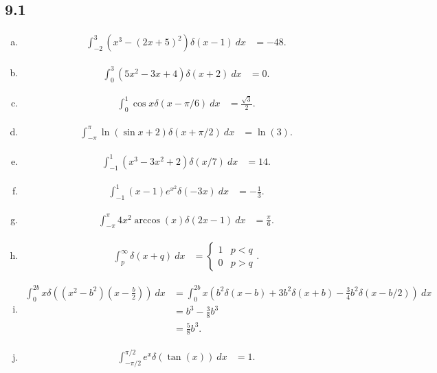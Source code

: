\documentclass[10pt]{mypackage}
\newcommand{\df}{\delta\!}
\begin{document}
\subsection{9.1}%
\begin{enumerate}[(a)]
  \item 
    \begin{align*}
      \int_{-2}^{3} \left(x^3 -\left(2x + 5\right)^2\right)\df\left(x-1\right)\:dx &= -48.
    \end{align*}
  \item
    \begin{align*}
      \int_{0}^{3} \left(5x^2 - 3x + 4\right)\df\left(x+2\right)\:dx &= 0.
    \end{align*}
  \item 
    \begin{align*}
      \int_{0}^{1} \cos x \df\left(x-\pi/6\right)\:dx &= \frac{\sqrt{3}}{2}.
    \end{align*}
  \item 
    \begin{align*}
      \int_{-\pi}^{\pi} \ln \left(\sin x + 2\right)\df\left(x+\pi/2\right)\:dx &= \ln(3).
    \end{align*}
  \item 
    \begin{align*}
      \int_{-1}^{1} \left(x^3 - 3x^2 + 2\right)\df\left(x/7\right)\:dx &= 14.
    \end{align*}
  \item
    \begin{align*}
      \int_{-1}^{1} (x-1)e^{x^2}\df\left(-3x\right)\:dx &= -\frac{1}{3}.
    \end{align*}
  \item
    \begin{align*}
      \int_{-\pi}^{\pi} 4x^2\arccos(x)\df\left(2x-1\right)\:dx &= \frac{\pi}{6}.
    \end{align*}
  \item
    \begin{align*}
      \int_{p}^{\infty} \df\left(x+q\right)\:dx &= \begin{cases}
        1 & p < q\\
        0 & p > q
      \end{cases}.
    \end{align*}
  \item 
    \begin{align*}
      \int_{0}^{2b} x\df\left(\left(x^2 - b^2\right)\left(x-\frac{b}{2}\right)\right)\:dx &= \int_{0}^{2b} x\left(b^2\delta\left(x-b\right) + 3b^2\delta\left(x+b\right) - \frac{3}{4}b^2\delta\left(x-b/2\right)\right)\:dx\\
                                                                                               &= b^3 - \frac{3}{8}b^3\\
                                                                                               &= \frac{5}{8}b^3.
    \end{align*}
  \item
    \begin{align*}
      \int_{-\pi/2}^{\pi/2} e^{x}\df\left(\tan(x)\right)\:dx &= 1.
    \end{align*}
\end{enumerate}
\end{document}
